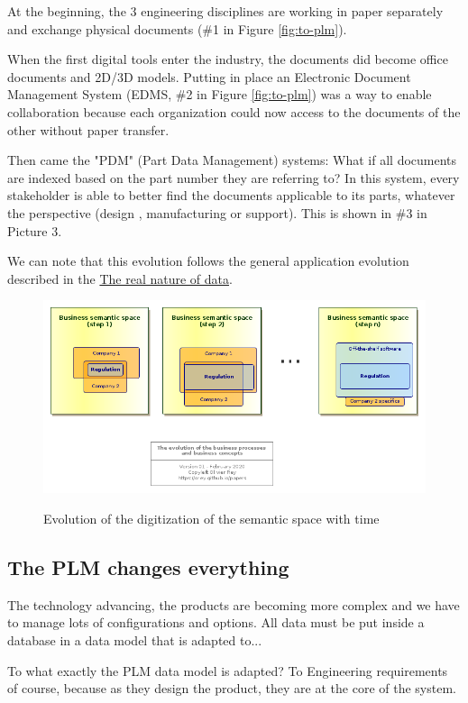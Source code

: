 \documentclass[]{article}
\begin{document}
At the beginning, the 3 engineering disciplines are working in paper separately and exchange physical documents (\#1 in Figure \ref{fig:to-plm}).

When the first digital tools enter the industry, the documents did become office documents and 2D/3D models. Putting in place an Electronic Document Management System (EDMS, \#2 in Figure \ref{fig:to-plm}) was a way to enable collaboration because each organization could now access to the documents of the other without paper transfer.

Then came the "PDM" (Part Data Management) systems: What if all documents are indexed based on the part number they are referring to? In this system, every stakeholder is able to better find the documents applicable to its parts, whatever the perspective (design , manufacturing or support). This is shown in \#3 in Picture 3.

We can note that this evolution follows the general application evolution described in the \href{https://orey.github.io/papers/articles/data-interop/}{The real nature of data}.

\begin{figure}[t]
\caption{Evolution of the digitization of the semantic space with time}
\includegraphics[width=\textwidth]{semantic-space.png}
\label{fig:semantic-space}
\end{figure}

\subsection{The PLM changes everything}

The technology advancing, the products are becoming more complex and we have to manage lots of configurations and options. All data must be put inside a database in a data model that is adapted to...

To what exactly the PLM data model is adapted? To Engineering requirements of course, because as they design the product, they are at the core of the system.
\end{document}
